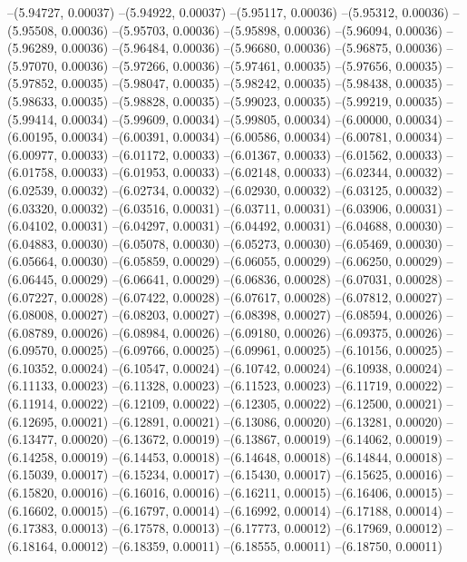 --(5.94727, 0.00037)
--(5.94922, 0.00037)
--(5.95117, 0.00036)
--(5.95312, 0.00036)
--(5.95508, 0.00036)
--(5.95703, 0.00036)
--(5.95898, 0.00036)
--(5.96094, 0.00036)
--(5.96289, 0.00036)
--(5.96484, 0.00036)
--(5.96680, 0.00036)
--(5.96875, 0.00036)
--(5.97070, 0.00036)
--(5.97266, 0.00036)
--(5.97461, 0.00035)
--(5.97656, 0.00035)
--(5.97852, 0.00035)
--(5.98047, 0.00035)
--(5.98242, 0.00035)
--(5.98438, 0.00035)
--(5.98633, 0.00035)
--(5.98828, 0.00035)
--(5.99023, 0.00035)
--(5.99219, 0.00035)
--(5.99414, 0.00034)
--(5.99609, 0.00034)
--(5.99805, 0.00034)
--(6.00000, 0.00034)
--(6.00195, 0.00034)
--(6.00391, 0.00034)
--(6.00586, 0.00034)
--(6.00781, 0.00034)
--(6.00977, 0.00033)
--(6.01172, 0.00033)
--(6.01367, 0.00033)
--(6.01562, 0.00033)
--(6.01758, 0.00033)
--(6.01953, 0.00033)
--(6.02148, 0.00033)
--(6.02344, 0.00032)
--(6.02539, 0.00032)
--(6.02734, 0.00032)
--(6.02930, 0.00032)
--(6.03125, 0.00032)
--(6.03320, 0.00032)
--(6.03516, 0.00031)
--(6.03711, 0.00031)
--(6.03906, 0.00031)
--(6.04102, 0.00031)
--(6.04297, 0.00031)
--(6.04492, 0.00031)
--(6.04688, 0.00030)
--(6.04883, 0.00030)
--(6.05078, 0.00030)
--(6.05273, 0.00030)
--(6.05469, 0.00030)
--(6.05664, 0.00030)
--(6.05859, 0.00029)
--(6.06055, 0.00029)
--(6.06250, 0.00029)
--(6.06445, 0.00029)
--(6.06641, 0.00029)
--(6.06836, 0.00028)
--(6.07031, 0.00028)
--(6.07227, 0.00028)
--(6.07422, 0.00028)
--(6.07617, 0.00028)
--(6.07812, 0.00027)
--(6.08008, 0.00027)
--(6.08203, 0.00027)
--(6.08398, 0.00027)
--(6.08594, 0.00026)
--(6.08789, 0.00026)
--(6.08984, 0.00026)
--(6.09180, 0.00026)
--(6.09375, 0.00026)
--(6.09570, 0.00025)
--(6.09766, 0.00025)
--(6.09961, 0.00025)
--(6.10156, 0.00025)
--(6.10352, 0.00024)
--(6.10547, 0.00024)
--(6.10742, 0.00024)
--(6.10938, 0.00024)
--(6.11133, 0.00023)
--(6.11328, 0.00023)
--(6.11523, 0.00023)
--(6.11719, 0.00022)
--(6.11914, 0.00022)
--(6.12109, 0.00022)
--(6.12305, 0.00022)
--(6.12500, 0.00021)
--(6.12695, 0.00021)
--(6.12891, 0.00021)
--(6.13086, 0.00020)
--(6.13281, 0.00020)
--(6.13477, 0.00020)
--(6.13672, 0.00019)
--(6.13867, 0.00019)
--(6.14062, 0.00019)
--(6.14258, 0.00019)
--(6.14453, 0.00018)
--(6.14648, 0.00018)
--(6.14844, 0.00018)
--(6.15039, 0.00017)
--(6.15234, 0.00017)
--(6.15430, 0.00017)
--(6.15625, 0.00016)
--(6.15820, 0.00016)
--(6.16016, 0.00016)
--(6.16211, 0.00015)
--(6.16406, 0.00015)
--(6.16602, 0.00015)
--(6.16797, 0.00014)
--(6.16992, 0.00014)
--(6.17188, 0.00014)
--(6.17383, 0.00013)
--(6.17578, 0.00013)
--(6.17773, 0.00012)
--(6.17969, 0.00012)
--(6.18164, 0.00012)
--(6.18359, 0.00011)
--(6.18555, 0.00011)
--(6.18750, 0.00011)
